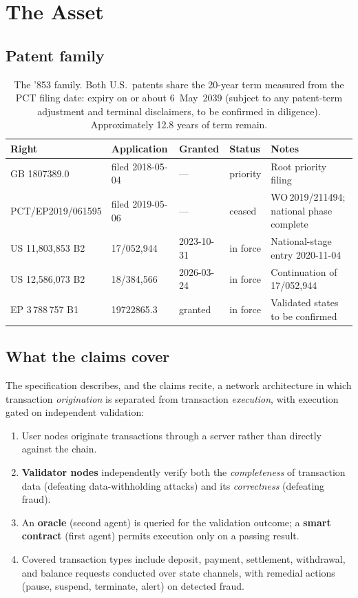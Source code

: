 \documentclass[11pt,a4paper]{article}
\begin{document}
\section{The Asset}

\subsection{Patent family}

\begin{table}[h]
\centering
\small
\begin{tabularx}{\textwidth}{@{}llllX@{}}
\toprule
\textbf{Right} & \textbf{Application} & \textbf{Granted} & \textbf{Status} & \textbf{Notes}\\
\midrule
GB 1807389.0 & filed 2018-05-04 & --- & priority & Root priority filing\\
PCT/EP2019/061595 & filed 2019-05-06 & --- & ceased & WO\,2019/211494; national phase complete\\
US 11,803,853 B2 & 17/052{,}944 & 2023-10-31 & in force & National-stage entry 2020-11-04\\
US 12,586,073 B2 & 18/384{,}566 & 2026-03-24 & in force & Continuation of 17/052{,}944\\
EP 3\,788\,757 B1 & 19722865.3 & granted & in force & Validated states to be confirmed\\
\bottomrule
\end{tabularx}
\caption{The '853 family. Both U.S.\ patents share the 20-year term
measured from the PCT filing date: expiry on or about 6~May~2039
(subject to any patent-term adjustment and terminal disclaimers, to be
confirmed in diligence). Approximately 12.8 years of term remain.}
\end{table}

\subsection{What the claims cover}

The specification describes, and the claims recite, a network
architecture in which transaction \emph{origination} is separated from
transaction \emph{execution}, with execution gated on independent
validation:

\begin{enumerate}[leftmargin=1.6em]
  \item User nodes originate transactions through a server rather than
  directly against the chain.
  \item \textbf{Validator nodes} independently verify both the
  \emph{completeness} of transaction data (defeating data-withholding
  attacks) and its \emph{correctness} (defeating fraud).
  \item An \textbf{oracle} (second agent) is queried for the validation
  outcome; a \textbf{smart contract} (first agent) permits execution
  only on a passing result.
  \item Covered transaction types include deposit, payment, settlement,
  withdrawal, and balance requests conducted over state channels, with
  remedial actions (pause, suspend, terminate, alert) on detected
  fraud.
\end{enumerate}
\end{document}
